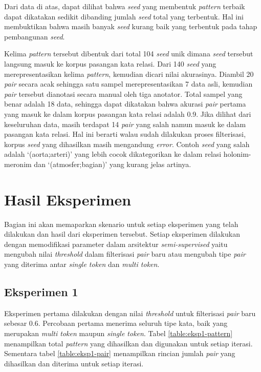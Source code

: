 \noindent Dari data di atas, dapat dilihat bahwa \textit{seed} yang membentuk \textit{pattern} terbaik dapat dikatakan sedikit dibanding jumlah \textit{seed} total yang terbentuk. Hal ini membuktikan bahwa masih banyak \textit{seed} kurang baik yang terbentuk pada tahap pembangunan \textit{seed}.

Kelima \textit{pattern} tersebut dibentuk dari total 104 \textit{seed} unik dimana \textit{seed} tersebut langsung masuk ke korpus pasangan kata relasi. Dari 140 \textit{seed} yang merepresentasikan kelima \textit{pattern}, kemudian dicari nilai akurasinya. Diambil 20 \textit{pair} secara acak sehingga satu sampel merepresentasikan 7 data asli, kemudian \textit{pair} tersebut dianotasi secara manual oleh tiga anotator. Total sampel yang benar adalah 18 data, sehingga dapat dikatakan bahwa akurasi \textit{pair} pertama yang masuk ke dalam korpus pasangan kata relasi adalah 0.9. Jika dilihat dari keseluruhan data, masih terdapat 14 \textit{pair} yang salah namun masuk ke dalam pasangan kata relasi. Hal ini berarti walau sudah dilakukan proses filterisasi, korpus \textit{seed} yang dihasilkan masih mengandung \textit{error}. Contoh \textit{seed} yang salah adalah `(aorta;arteri)' yang lebih cocok dikategorikan ke dalam relasi holonim-meronim dan `(atmosfer;bagian)' yang kurang jelas artinya.

\section{Hasil Eksperimen}
Bagian ini akan memaparkan skenario untuk setiap eksperimen yang telah dilakukan dan hasil dari eksperimen tersebut. Setiap eksperimen dilakukan dengan memodifikasi parameter dalam arsitektur \textit{semi-supervised} yaitu mengubah nilai \textit{threshold} dalam filterisasi \textit{pair} baru atau mengubah tipe \textit{pair} yang diterima antar \textit{single token} dan \textit{multi token}.

\subsection{Eksperimen 1}
Eksperimen pertama dilakukan dengan nilai \textit{threshold} untuk filterisasi \textit{pair} baru sebesar 0.6. Percobaan pertama menerima seluruh tipe kata, baik yang merupakan \textit{multi token} maupun \textit{single token}. Tabel \ref{table:eksp1-pattern} menampilkan total \textit{pattern} yang dihasilkan dan digunakan untuk setiap iterasi. Sementara tabel \ref{table:eksp1-pair} menampilkan rincian jumlah \textit{pair} yang dihasilkan dan diterima untuk setiap iterasi.

